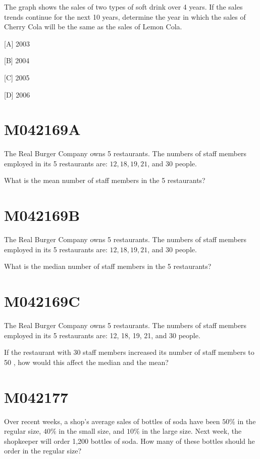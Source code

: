 \documentclass[12pt]{article}
\begin{document}
The graph shows the sales of two types of soft drink over 4 years. If the sales trends continue for the next 10 years, determine the year in which the sales of Cherry Cola will be the same as the sales of Lemon Cola.

[A] 2003

[B] 2004

[C] 2005

[D] 2006

\newpage
\section*{M042169A}

The Real Burger Company owns 5 restaurants. The numbers of staff members employed in its 5 restaurants are: $12,18,19,21$, and 30 people.

What is the mean number of staff members in the 5 restaurants?

\newpage
\section*{M042169B}

The Real Burger Company owns 5 restaurants. The numbers of staff members employed in its 5 restaurants are: $12,18,19,21$, and 30 people.

What is the median number of staff members in the 5 restaurants?

\newpage
\section*{M042169C}

The Real Burger Company owns 5 restaurants. The numbers of staff members employed in its 5 restaurants are: 12, 18, 19, 21, and 30 people.

If the restaurant with 30 staff members increased its number of staff members to 50 , how would this affect the median and the mean?

\newpage
\section*{M042177}

Over recent weeks, a shop's average sales of bottles of soda have been $50 \%$ in the regular size, $40 \%$ in the small size, and $10 \%$ in the large size. Next week, the shopkeeper will order 1,200 bottles of soda. How many of these bottles should he order in the regular size?
\end{document}

